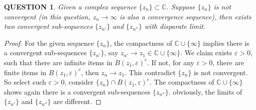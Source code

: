 \documentclass[12pt]{article}
\renewcommand{\(}{\left(}%
\renewcommand{\)}{\right)}%
\renewcommand{\[}{\left[}%
\renewcommand{\]}{\right]}%
\renewcommand{\c}{\mathbb{C}}
\newtheorem{question}{QUESTION}[section]}
\newtheorem{proof}{Proof.}}
\begin{document}
  \begin{question}
  	Given a complex sequence $\{z_n\}\subset\c$. Suppose $\{z_n\}$ is not convergent (in this question, $z_n\to\infty$ is also a convergence sequence), then exists two convergent sub-sequences $\{z_{n'}\}$ and $\{z_{n''}\}$ with disparate limit.
  \end{question}
  \begin{proof}
  	For the given sequence $\{z_n\}$, the compactness of $\c\cup\{\infty\}$ implies there is a convergent sub-sequences $\{z_{n'}\}$, say $z_{n'}\to z_1\in \c\cup\{\infty\}$. We claim exists $\varepsilon>0$, such that there are infinite items in $B(z_1,\varepsilon)^c$. If not, for any $\varepsilon>0$, there are finite items in $B(z_1,\varepsilon)^c$, then $z_n\to z_1$. This contradict $\{z_n\}$ is not convergent. So select such $\varepsilon>0$, consider $\{z_n\}\cap B(z_1,\varepsilon)^c$. The compactness of $\c\cup\{\infty\}$ shows again there is a convergent sub-sequences $\{z_{n''}\}$. obviously, the limits of $\{z_{n'}\}$ and $\{z_{n''}\}$ are different.
  \end{proof}
  
\end{document}
